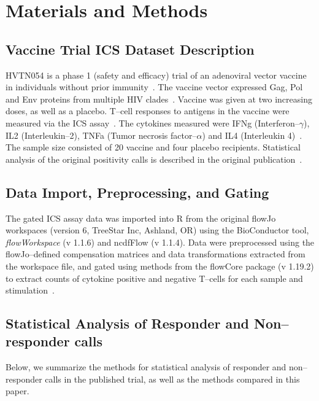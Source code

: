 \documentclass[11pt]{article}
\begin{document}
\section{Materials and Methods}
\subsection{Vaccine Trial ICS Dataset Description}
HVTN054 is a phase 1 (safety and efficacy) trial of an adenoviral vector vaccine in individuals without prior immunity~\cite{Peiperl:2010ej}. The vaccine vector expressed Gag, Pol and Env proteins from multiple HIV clades~\cite{Peiperl:2010ej}. Vaccine was given at two increasing doses, as well as a placebo. T--cell responses to antigens in the vaccine were measured via the ICS assay~\cite{Peiperl:2010ej,Horton:2007tsa}. The cytokines measured were IFNg (Interferon--$\gamma$), IL2 (Interleukin--2), TNFa (Tumor necrosis factor--$\alpha$) and IL4 (Interleukin 4)~\cite{Horton:2007tsa}. The sample size consisted of 20 vaccine and four placebo recipients. Statistical analysis of the original positivity calls is described in the original publication~\cite{Peiperl:2010ej}.
 
 


\subsection{Data Import, Preprocessing, and Gating}
The gated ICS assay data was imported into R from the original flowJo workspaces (version 6, TreeStar Inc, Ashland, OR)  using the BioConductor tool, \textit{flowWorkspace} (v 1.1.6) and ncdfFlow (v 1.1.4). Data were preprocessed using the flowJo--defined compensation matrices and data transformations extracted from the workspace file, and gated using methods from the flowCore package (v 1.19.2) to extract counts of cytokine positive and negative T--cells for each sample and stimulation~\cite{Hahne:2009vv}.

\subsection{Statistical Analysis of Responder and Non--responder calls}
Below, we summarize the methods for statistical analysis of responder and non--responder calls in the published trial, as well as the methods compared in this paper.
\end{document}
